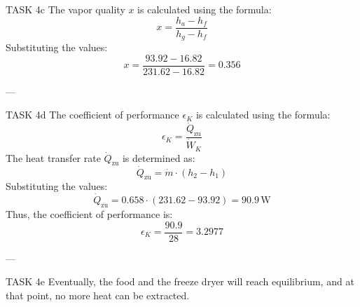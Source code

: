 TASK 4c  
The vapor quality \( x \) is calculated using the formula:  
\[
x = \frac{h_a - h_f}{h_g - h_f}
\]  
Substituting the values:  
\[
x = \frac{93.92 - 16.82}{231.62 - 16.82} = 0.356
\]  

---

TASK 4d  
The coefficient of performance \( \epsilon_K \) is calculated using the formula:  
\[
\epsilon_K = \frac{\dot{Q}_{\text{zu}}}{\dot{W}_K}
\]  
The heat transfer rate \( \dot{Q}_{\text{zu}} \) is determined as:  
\[
\dot{Q}_{\text{zu}} = \dot{m} \cdot (h_2 - h_1)
\]  
Substituting the values:  
\[
\dot{Q}_{\text{zu}} = 0.658 \cdot (231.62 - 93.92) = 90.9 \, \text{W}
\]  
Thus, the coefficient of performance is:  
\[
\epsilon_K = \frac{90.9}{28} = 3.2977
\]  

---

TASK 4e  
Eventually, the food and the freeze dryer will reach equilibrium, and at that point, no more heat can be extracted.